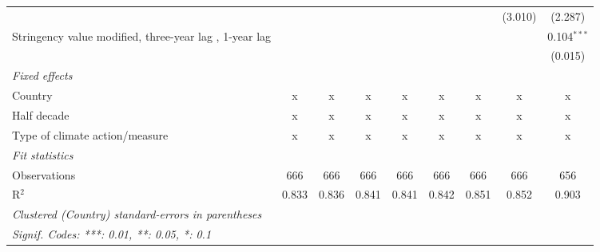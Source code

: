 \begin{table}[htbp]
\begin{tabular}{lcccccccc}
                                                                                                 &         &               &               &               &               &                & (3.010)        & (2.287)\\   
      Stringency value modified, three-year lag , 1-year lag                                     &         &               &               &               &               &                &                & 0.104$^{***}$\\   
                                                                                                 &         &               &               &               &               &                &                & (0.015)\\   
      \emph{Fixed effects}\\
      Country                                                                                    & x       & x             & x             & x             & x             & x              & x              & x\\  
      Half decade                                                                                & x       & x             & x             & x             & x             & x              & x              & x\\  
      Type of climate action/measure                                                             & x       & x             & x             & x             & x             & x              & x              & x\\  
      \midrule \emph{Fit statistics}\\
      Observations                                                                               & 666     & 666           & 666           & 666           & 666           & 666            & 666            & 656\\  
      R$^2$                                                                                      & 0.833   & 0.836         & 0.841         & 0.841         & 0.842         & 0.851          & 0.852          & 0.903\\  
      \midrule
      \multicolumn{9}{l}{\emph{Clustered (Country) standard-errors in parentheses}}\\
      \multicolumn{9}{l}{\emph{Signif. Codes: ***: 0.01, **: 0.05, *: 0.1}}\\
   \end{tabular}
\end{table}


